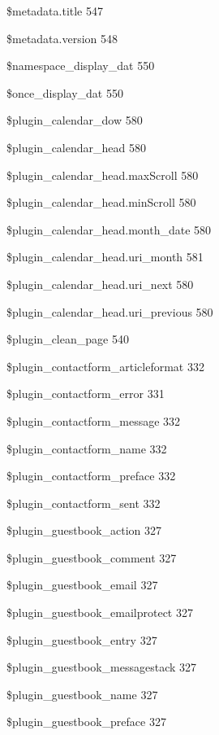 \documentclass{book}
\renewcommand\subitem{\par}
\begin{document}
\begin{multicols}{2}
\begin{osp-index}
    \subitem \$metadata.title\hspace{1mm} 547
    \subitem \$metadata.version\hspace{1mm} 548
    \subitem \$namespace\_display\_dat\hspace{1mm} 550
    \subitem \$once\_display\_dat\hspace{1mm} 550
    \subitem \$plugin\_calendar\_dow\hspace{1mm} 580
    \subitem \$plugin\_calendar\_head\hspace{1mm} 580
    \subitem \$plugin\_calendar\_head.maxScroll\hspace{1mm} 580
    \subitem \$plugin\_calendar\_head.minScroll\hspace{1mm} 580
    \subitem \$plugin\_calendar\_head.month\_date\hspace{1mm} 580
    \subitem \$plugin\_calendar\_head.uri\_month\hspace{1mm} 581
    \subitem \$plugin\_calendar\_head.uri\_next\hspace{1mm} 580
    \subitem \$plugin\_calendar\_head.uri\_previous\hspace{1mm} 580
    \subitem \$plugin\_clean\_page\hspace{1mm} 540
    \subitem \$plugin\_contactform\_articleformat\hspace{1mm} 332
    \subitem \$plugin\_contactform\_error\hspace{1mm} 331
    \subitem \$plugin\_contactform\_message\hspace{1mm} 332
    \subitem \$plugin\_contactform\_name\hspace{1mm} 332
    \subitem \$plugin\_contactform\_preface\hspace{1mm} 332
    \subitem \$plugin\_contactform\_sent\hspace{1mm} 332
    \subitem \$plugin\_guestbook\_action\hspace{1mm} 327
    \subitem \$plugin\_guestbook\_comment\hspace{1mm} 327
    \subitem \$plugin\_guestbook\_email\hspace{1mm} 327
    \subitem \$plugin\_guestbook\_emailprotect\hspace{1mm} 327
    \subitem \$plugin\_guestbook\_entry\hspace{1mm} 327
    \subitem \$plugin\_guestbook\_messagestack\hspace{1mm} 327
    \subitem \$plugin\_guestbook\_name\hspace{1mm} 327
    \subitem \$plugin\_guestbook\_preface\hspace{1mm} 327

\end{osp-index}
\end{multicols}
\end{document}
